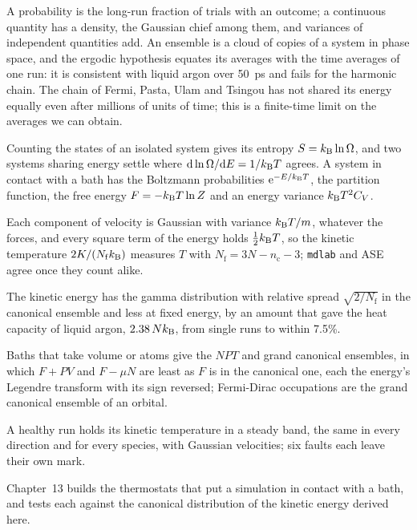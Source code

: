 
A probability is the long-run fraction of trials with an outcome; a
continuous quantity has a density, the Gaussian chief among them, and
variances of independent quantities add. An ensemble is a cloud of copies
of a system in phase space, and the ergodic hypothesis equates its
averages with the time averages of one run: it is consistent with
liquid argon over \SI{50}{\pico\second} and fails for the harmonic chain. The chain of Fermi, Pasta, Ulam and
Tsingou has not shared its energy equally even after millions of units of
time; this is a finite-time limit on the averages we can obtain.

Counting the states of an isolated
system gives its entropy $S = k_{\mathrm{B}}\ln\Omega$, and two systems sharing
energy settle where $\mathrm{d}\ln\Omega/\mathrm{d} E = 1/k_{\mathrm{B}} T$ agrees. A system in
contact with a bath has the Boltzmann probabilities
$\mathrm{e}^{-E/k_{\mathrm{B}} T}$, the partition function, the free energy $F =
-k_{\mathrm{B}} T\ln Z$ and an energy variance $k_{\mathrm{B}} T^2C_V$.

Each component of
velocity is Gaussian with variance $k_{\mathrm{B}} T/m$, whatever the forces, and
every square term of the energy holds $\frac12k_{\mathrm{B}} T$, so the kinetic
temperature $2K/(N_{\mathrm f}k_{\mathrm{B}})$ measures $T$ with $N_{\mathrm f} = 3N -
n_{\mathrm c} - 3$; \texttt{mdlab} and ASE agree once they count alike.

The kinetic energy has the gamma distribution with relative spread
$\sqrt{2/N_{\mathrm f}}$ in the canonical ensemble and less at fixed
energy, by an amount that gave the heat capacity of liquid argon,
$2.38\,Nk_{\mathrm{B}}$, from single runs to within 7.5\%.

Baths that take volume or
atoms give the $NPT$ and grand canonical ensembles, in which $F + PV$ and
$F - \mu N$ are least as $F$ is in the canonical one, each the energy's
Legendre transform with its sign reversed; Fermi-Dirac occupations are the
grand canonical ensemble of an orbital.

A healthy run
holds its kinetic temperature in a steady band, the same in every
direction and for every species, with Gaussian velocities; six faults
each leave their own mark.

Chapter~13 builds the thermostats that put a simulation in contact with a
bath, and tests each against the canonical distribution of the kinetic
energy derived here.
